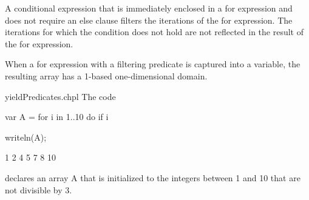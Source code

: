 A conditional expression that is immediately enclosed in a for
expression and does not require an else clause filters the iterations
of the for expression.
The iterations for which the condition does not hold
are not reflected in the result of the for expression.

When a for expression with a filtering predicate is captured into
a variable, the resulting array has a 1-based one-dimensional domain.

\begin{chapelexample}{yieldPredicates.chpl}
The code
\begin{chapel}
var A = for i in 1..10 do if i %
\end{chapel}
\begin{chapelpost}
writeln(A);
\end{chapelpost}
\begin{chapeloutput}
1 2 4 5 7 8 10
\end{chapeloutput}
declares an array A that is initialized to the integers between
1 and 10 that are not divisible by 3.
\end{chapelexample}
